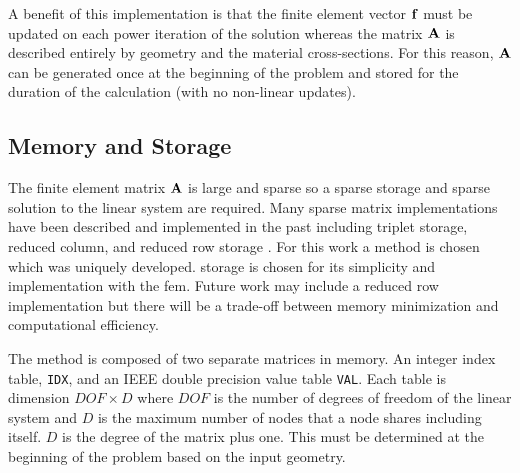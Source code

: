     A benefit of this implementation is that the finite element vector $\mathbf{f}$ 
    must be updated on each power iteration of the solution whereas the matrix 
    $\mathbf{A}$ is described entirely by geometry and the material cross-sections. For
    this reason, $\mathbf{A}$ can be generated once at the beginning of the problem and 
    stored for the duration of the calculation (with no non-linear updates).
    \FloatBarrier %

  \subsection{Memory and Storage}
    The finite element matrix $\mathbf{A}$ is large and sparse so a sparse storage and
    sparse solution to the linear system are required. Many sparse matrix 
    implementations have been described and implemented in the past including
    triplet storage, reduced column, and reduced row storage \cite{sparseBLAS}.
    For this work a \twotable method is chosen which was uniquely 
    developed. \twotable storage is chosen for its simplicity and implementation
    with the \gls{fem}. Future work may include a reduced row implementation but 
    there will be a trade-off between memory minimization and computational 
    efficiency.
    
    The \twotable method is composed of two separate matrices in memory. An 
    integer index table, \texttt{IDX}, and an IEEE double precision value table
    \texttt{VAL}. Each table is dimension $DOF \times D$ where $DOF$ is the
    number of degrees of freedom of the linear system and $D$ is the maximum
    number of nodes that a node shares including itself. $D$ is the degree of
    the matrix plus one. This must be determined at the beginning of the
    problem based on the input geometry.
    
